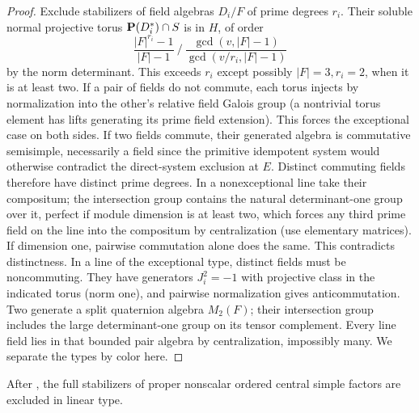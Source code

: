 \begin{proof}
Exclude stabilizers of field algebras \(D_i/F\) of prime degrees \(r_i\). Their soluble normal projective torus \({\bf P}(D_i^*)\cap S\) is in \(H\), of order
\[
 \frac{|F|^{r_i}-1}{|F|-1}\ \big/\ \frac{\gcd(v,|F|-1)}{\gcd(v/r_i,|F|-1)}
\]
by the norm determinant. This exceeds \(r_i\) except possibly \(|F|=3,r_i=2\), when it is at least two. If a pair of fields do not commute, each torus injects by normalization into the other's relative field Galois group (a nontrivial torus element has lifts generating its prime field extension). This forces the exceptional case on both sides. If two fields commute, their generated algebra is commutative semisimple, necessarily a field since the primitive idempotent system would otherwise contradict the direct-system exclusion at \(E\). Distinct commuting fields therefore have distinct prime degrees. In a nonexceptional line take their compositum; the intersection group contains the natural determinant-one group over it, perfect if module dimension is at least two, which forces any third prime field on the line into the compositum by centralization (use elementary matrices). If dimension one, pairwise commutation alone does the same. This contradicts distinctness. In a line of the exceptional type, distinct fields must be noncommuting. They have generators \(J_i^2=-1\) with projective class in the indicated torus (norm one), and pairwise normalization gives anticommutation. Two generate a split quaternion algebra \(M_2(F)\); their intersection group includes the large determinant-one group on its tensor complement. Every line field lies in that bounded pair algebra by centralization, impossibly many. We separate the types by color here.
\end{proof}

\begin{proposition}\label{c:linear-factors}
After , the full stabilizers of proper nonscalar ordered central simple factors are excluded in linear type.
\end{proposition}

